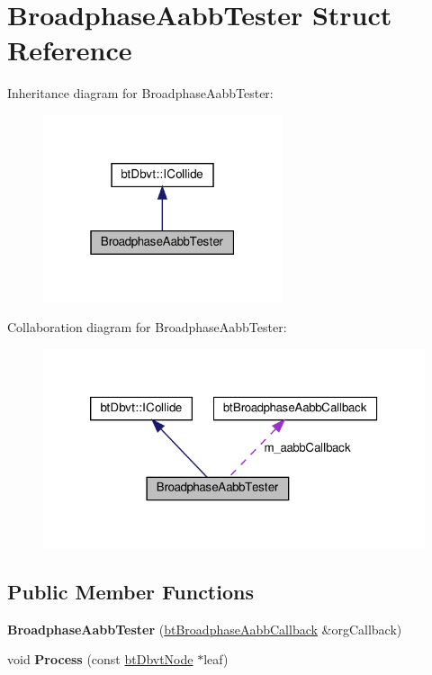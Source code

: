 \hypertarget{structBroadphaseAabbTester}{}\section{Broadphase\+Aabb\+Tester Struct Reference}
\label{structBroadphaseAabbTester}


Inheritance diagram for Broadphase\+Aabb\+Tester\+:
\nopagebreak
\begin{figure}[H]
\begin{center}
\leavevmode
\includegraphics[width=199pt]{structBroadphaseAabbTester__inherit__graph}
\end{center}
\end{figure}


Collaboration diagram for Broadphase\+Aabb\+Tester\+:
\nopagebreak
\begin{figure}[H]
\begin{center}
\leavevmode
\includegraphics[width=320pt]{structBroadphaseAabbTester__coll__graph}
\end{center}
\end{figure}
\subsection*{Public Member Functions}
\begin{DoxyCompactItemize}
\item 
\mbox{\label{structBroadphaseAabbTester_a7afe63b7de086ff8a329ba6ed6abf880}} 
{\bfseries Broadphase\+Aabb\+Tester} (\hyperlink{structbtBroadphaseAabbCallback}{bt\+Broadphase\+Aabb\+Callback} \&org\+Callback)
\item 
\mbox{\label{structBroadphaseAabbTester_a6c6a2efd374d3805aa9dc877fd5d93e6}} 
void {\bfseries Process} (const \hyperlink{structbtDbvtNode}{bt\+Dbvt\+Node} $\ast$leaf)
\end{DoxyCompactItemize}
